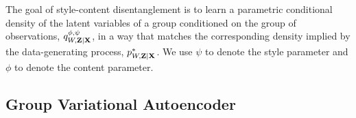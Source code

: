 \documentclass[../thesis.tex]{subfiles}
\begin{document}

The goal of style-content disentanglement is to learn a parametric conditional density of the latent variables of a group conditioned on the group of observations, $\myfunc{q}^{\phi, \psi}_{\myrv{w}, \mygroup{\myrv{z}} | \mygroup{\myrv{x}}}$, in a way that matches the corresponding density implied by the data-generating process, $\myfunc{p}^{*}_{\myrv{w}, \mygroup{\myrv{z}} | \mygroup{\myrv{x}}}$. We use $\psi$ to denote the style parameter and $\phi$ to denote the content parameter. 


\subsection{Group Variational Autoencoder}
\end{document}
